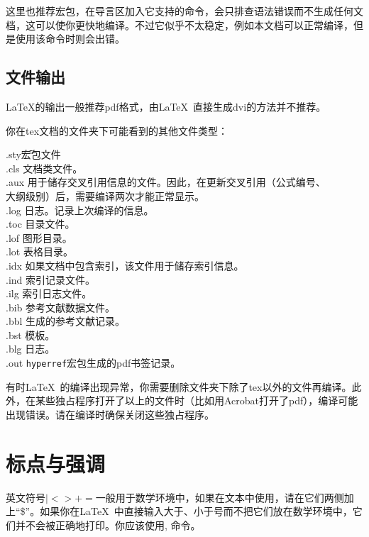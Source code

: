 这里也推荐宏包，在导言区加入它支持的命令，会只排查语法错误而不生成任何文档，这可以使你更快地编译。不过它似乎不太稳定，例如本文档可以正常编译，但是使用该命令时则会出错。

\subsection{文件输出}
\LaTeX{}的输出一般推荐pdf格式，由\LaTeX\ 直接生成dvi的方法并不推荐。

你在tex文档的文件夹下可能看到的其他文件类型：
\begin{tabbing}
	.sty{\hspace{2em}}\=宏包文件\\
	.cls	\> 文档类文件。\\
	.aux    \> 用于储存交叉引用信息的文件。因此，在更新交叉引用（公式编号、\\
	\> 大纲级别）后，需要编译两次才能正常显示。\\
	.log    \> 日志。记录上次编译的信息。\\
	.toc    \> 目录文件。\\
	.lof    \> 图形目录。\\
	.lot    \> 表格目录。\\
	.idx    \> 如果文档中包含索引，该文件用于储存索引信息。\\
	.ind	\> 索引记录文件。\\
	.ilg	\> 索引日志文件。\\
	.bib	\> \bibtex 参考文献数据文件。\\
	.bbl	\> \bibtex 生成的参考文献记录。\\
	.bst	\> \bibtex 模板。\\
	.blg	\> \bibtex 日志。\\
	.out	\> \texttt{hyperref}宏包生成的pdf书签记录。
\end{tabbing}

有时\LaTeX\ 的编译出现异常，你需要删除文件夹下除了tex以外的文件再编译。此外，在某些独占程序打开了以上的文件时（比如用Acrobat打开了pdf），编译可能出现错误。请在编译时确保关闭这些独占程序。

\section{标点与强调}
英文符号$|<>+=$一般用于数学环境中，如果在文本中使用，请在它们两侧加上“\$”。如果你在\LaTeX\ 中直接输入大于、小于号而不把它们放在数学环境中，它们并不会被正确地打印。你应该使用, 命令。

